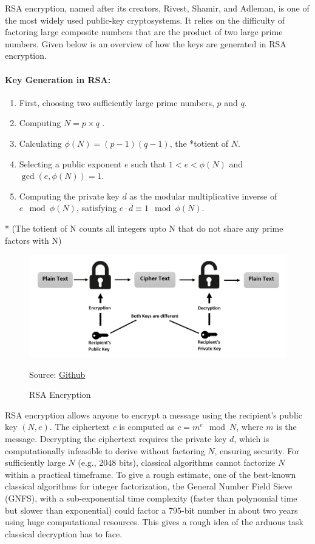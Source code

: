 \documentclass{article}
\newcommand{\source}[1]{\caption*{Source: {#1}} }
\begin{document}
RSA encryption, named after its creators, Rivest, Shamir, and Adleman, is one of the most widely used public-key cryptosystems. It relies on the difficulty of factoring large composite numbers that are the product of two large prime numbers. Given below is an overview of how the keys are generated in RSA encryption.

\paragraph{Key Generation in RSA:}
\begin{enumerate}
    \item  First, choosing two sufficiently large prime numbers, $p$ and $q$.
    \item  Computing $N = p \times q$ .
    \item Calculating $\phi(N) = (p-1)(q-1)$, the *totient of $N$.
    \item Selecting a public exponent $e$ such that $1 < e < \phi(N)$ and $\gcd(e, \phi(N)) = 1$.
    \item Computing the private key $d$ as the modular multiplicative inverse of $e \mod \phi(N)$, satisfying $e \cdot d \equiv 1 \mod \phi(N)$.
\end{enumerate}

* (The totient of N counts all integers upto N that do not share any prime factors with N) \\

\begin{figure}[h]
    \centering
    \includegraphics[width = 10.00cm\textwidth]{rsa.png}
     \caption{RSA Encryption}
    \source{\href{https://github.com/AbdullahAlhussein/RSA-Algorithm}{Github}}
   
\end{figure}

RSA encryption allows anyone to encrypt a message using the recipient's public key \((N, e)\). The ciphertext \(c\) is computed as \(c = m^e \mod N\), where \(m\) is the message. Decrypting the ciphertext requires the private key \(d\), which is computationally infeasible to derive without factoring \(N\), ensuring security. For sufficiently large $N$ (e.g., 2048 bits), classical algorithms cannot factorize $N$ within a practical timeframe. To give a rough estimate, one of the best-known classical algorithms for integer factorization, the General Number Field Sieve (GNFS), with a sub-exponential time complexity (faster than polynomial time but slower than exponential) could factor a 795-bit number in about two years using huge computational resources.
This gives a rough idea of the arduous task classical decryption has to face.
\end{document}
